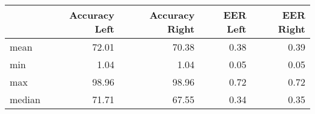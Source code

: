 \begin{tabular}{lrrrr}
\toprule
{} &  Accuracy Left &  Accuracy Right &  EER Left &  EER Right \\
\midrule
mean   &          72.01 &           70.38 &      0.38 &       0.39 \\
min    &           1.04 &            1.04 &      0.05 &       0.05 \\
max    &          98.96 &           98.96 &      0.72 &       0.72 \\
median &          71.71 &           67.55 &      0.34 &       0.35 \\
\bottomrule
\end{tabular}
